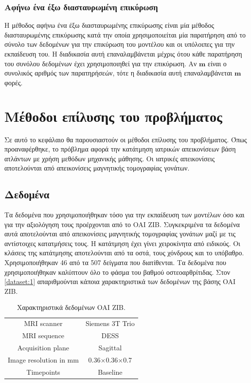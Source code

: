 \documentclass[a4paper,12pt]{article}
\begin{document}
\subsubsection{Αφήνω ένα έξω διασταυρωμένη επικύρωση}

Η μέθοδος αφήνω ένα έξω διασταυρωμένης επικύρωσης είναι μία μέθοδος
διασταυρωμένης επικύρωσης κατά την οποία χρησιμοποιείται μία παρατήρηση από το
σύνολο των δεδομένων για την επικύρωση του μοντέλου και οι υπόλοιπες για την
εκπαίδευση του. Η διαδικασία αυτή επαναλαμβάνεται μέχρις ότου κάθε παρατήρηση
του συνόλου δεδομένων έχει χρησιμοποιηθεί για την επικύρωση. Αν $\bm{m}$ είναι ο
συνολικός αριθμός των παρατηρήσεών, τότε η διαδικασία αυτή επαναλαμβάνεται
$\bm{m}$ φορές.

\section{Μέθοδοι επίλυσης του προβλήματος}

Σε αυτό το κεφάλαιο θα παρουσιαστούν οι μέθοδοι επίλυσης του προβλήματος. Όπως
προαναφέρθηκε, το πρόβλημα αφορά την κατάτμηση ιατρικών απεικονίσεων βάση
ατλάντων με χρήση μεθόδων μηχανικής μάθησης. Οι ιατρικές απεικονίσεις
αποτελούνται από απεικονίσεις μαγνητικής τομογραφίας γονάτων.

\subsection{Δεδομένα}

Τα δεδομένα που χρησιμοποιήθηκαν τόσο για την εκπαίδευση των μοντέλων όσο και
για την αξιολόγηση τους προέρχονται από το OAI ZIB. Συγκεκριμένα τα δεδομένα
αυτά αποτελούνται από απεικονίσεις μαγνητικής τομογραφίας γονάτων μαζί με τις
αντίστοιχες κατατμήσεις τους. Η κατάτμηση έχει γίνει χειροκίνητα από ειδικούς.
Οι κλάσεις της κατάτμησης αποτελούνται από τα οστά, τους χόνδρους και το
υπόβαθρο.  Χρησιμοποιήθηκαν 46 από τα 507 δείγματα που διατίθενται. Τα δεδομένα
που χρησιμοποιήθηκαν καλύπτουν όλο το φάσμα του βαθμού οστεοαρθρίτιδας. Στον
\autoref{dataset:1} απαριθμούνται κάποια χαρακτηριστικά των δεδομένων της βάσης
OAI ZIB.

\begin{table}[h!]
    \centering
    \begin{tabular}{|c|c|} 
        \hline
        MRI scanner            & Siemens 3T Trio \\ 
        MRI sequence           & DESS            \\
        Acquisition plane      & Sagittal        \\
        Image resolution in mm & 0.36×0.36×0.7   \\
        Timepoints             & Baseline        \\
        \hline
    \end{tabular}
    \caption{Χαρακτηριστικά δεδομένων OAI ZIB.}
    \label{dataset:1}
\end{table}
\end{document}

